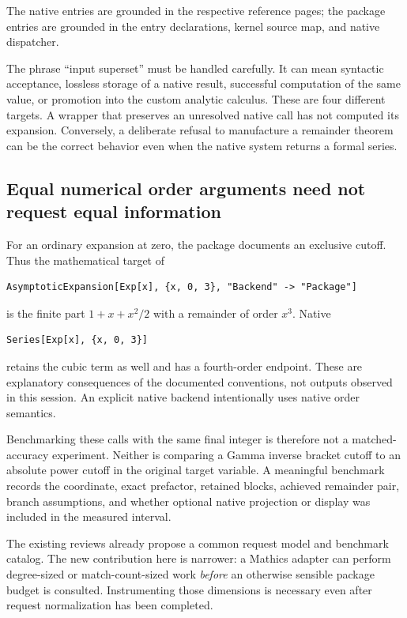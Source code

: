 \documentclass[11pt,a4paper]{article}
\begin{document}
The native entries are grounded in the respective reference pages; the package entries are grounded in the entry declarations, kernel source map, and native dispatcher.\cite{wlseries,wlseriesdata,wlinverse,wlasolve,wldiscrete,wloperations,coreentry,kernelmap,native}

The phrase ``input superset'' must be handled carefully. It can mean syntactic acceptance, lossless storage of a native result, successful computation of the same value, or promotion into the custom analytic calculus. These are four different targets. A wrapper that preserves an unresolved native call has not computed its expansion. Conversely, a deliberate refusal to manufacture a remainder theorem can be the correct behavior even when the native system returns a formal series.

\subsection{Equal numerical order arguments need not request equal information}
For an ordinary expansion at zero, the package documents an exclusive cutoff. Thus the mathematical target of
\begin{lstlisting}[language=Wolfram]
AsymptoticExpansion[Exp[x], {x, 0, 3}, "Backend" -> "Package"]
\end{lstlisting}
is the finite part $1+x+x^2/2$ with a remainder of order $x^3$. Native
\begin{lstlisting}[language=Wolfram]
Series[Exp[x], {x, 0, 3}]
\end{lstlisting}
retains the cubic term as well and has a fourth-order endpoint. These are explanatory consequences of the documented conventions, not outputs observed in this session. An explicit native backend intentionally uses native order semantics.\cite{coreentry,wlseries}

Benchmarking these calls with the same final integer is therefore not a matched-accuracy experiment. Neither is comparing a Gamma inverse bracket cutoff to an absolute power cutoff in the original target variable. A meaningful benchmark records the coordinate, exact prefactor, retained blocks, achieved remainder pair, branch assumptions, and whether optional native projection or display was included in the measured interval.

The existing reviews already propose a common request model and benchmark catalog. The new contribution here is narrower: a Mathics adapter can perform degree-sized or match-count-sized work \emph{before} an otherwise sensible package budget is consulted. Instrumenting those dimensions is necessary even after request normalization has been completed.
\end{document}
